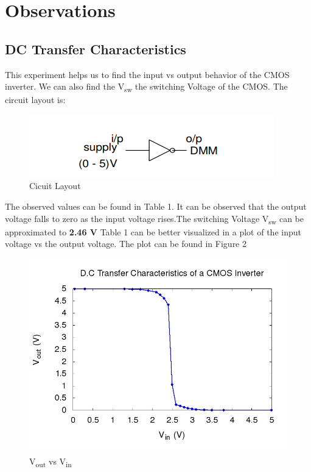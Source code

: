 \documentclass[12pt]{article}
\begin{document}
\section{Observations}
\subsection{DC Transfer Characteristics}
This experiment helps us to find the input vs output behavior of the CMOS inverter. We can also find the V\textsubscript{sw} the switching Voltage of the CMOS. The circuit layout is:
\begin{figure}[h]
    \centering
    \includegraphics{figs/DC_chts.png}
    \caption{Cicuit Layout}
    \label{fig:my_label}
\end{figure}
\newline The observed values can be found in Table 1. It can be observed that the output voltage falls to zero as the input voltage rises.The switching Voltage V\textsubscript{sw} can be approximated to \textbf{2.46 V}
\newline Table 1 can be better visualized in a plot of the input voltage vs the output voltage. The plot can be found in Figure 2
\begin{figure}[!h]
    \centering
    \includegraphics[scale = .6]{figs/DC_ch.jpg}
    \caption{V\textsubscript{out} vs V\textsubscript{in}}
    \label{fig:my_label}
\end{figure}
\end{document}
